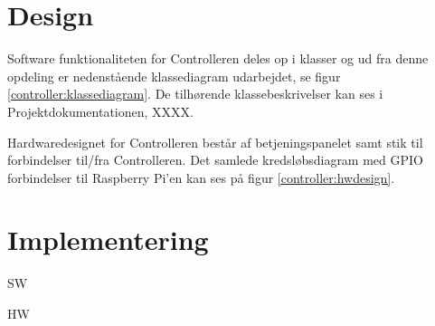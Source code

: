 \section{Design}
\label{ctrl_design}

Software funktionaliteten for Controlleren deles op i klasser og ud fra denne opdeling er nedenstående klassediagram udarbejdet, se figur \ref{controller:klassediagram}. De tilhørende klassebeskrivelser kan ses i Projektdokumentationen, XXXX.


Hardwaredesignet for Controlleren består af betjeningspanelet samt stik til forbindelser til/fra Controlleren. Det samlede kredsløbsdiagram med GPIO forbindelser til Raspberry Pi'en kan ses på figur \ref{controller:hwdesign}.


\section{Implementering}
\label{ctrl_implementering}

SW


HW



